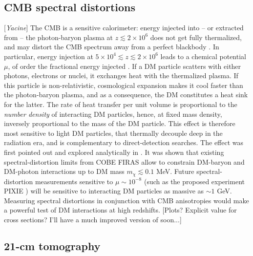 \documentclass[12pt]{article}
\newcommand{\Contributors}[1]{ {\footnotesize [\textit{#1}]}}
\begin{document}
\subsection{CMB spectral distortions}
\Contributors{Yacine}
The CMB is a sensitive calorimeter: energy injected into -- or extracted from -- the photon-baryon plasma at $z \lesssim 2 \times 10^6$ does not get fully thermalized, and may distort the CMB spectrum away from a perfect blackbody \cite{Hu_96}. In particular, energy injection at $5 \times 10^4 \lesssim z \lesssim 2 \times 10^6$ leads to a chemical potential $\mu$, of order the fractional energy injected \cite{Chluba_13}. If a DM particle scatters with either photons, electrons or nuclei, it exchanges heat with the thermalized plasma. If this particle is non-relativistic, cosmological expansion makes it cool faster than the photon-baryon plasma, and as a consequence, the DM constitutes a heat sink for the latter. The rate of heat transfer per unit volume is proportional to the \emph{number density} of interacting DM particles, hence, at fixed mass density, inversely proportional to the mass of the DM particle. This effect is therefore most sensitive to light DM particles, that thermally decouple deep in the radiation era, and is complementary to direct-detection searches. The effect was first pointed out and explored analytically in \cite{AliHaimoud_15}. It was shown that existing spectral-distortion limits from COBE FIRAS \cite{Fixsen_96} allow to constrain DM-baryon and DM-photon interactions up to DM mass $m_\chi \lesssim 0.1$ MeV. Future spectral-distortion measurements sensitive to $\mu \sim 10^{-8}$ (such as the proposed experiment PIXIE \cite{Kogut_11}) will be sensitive to interacting DM particles as massive as $\sim 1$ GeV. Measuring spectral distortions in conjunction with CMB anisotropies would make a powerful test of DM interactions at high redshifts. [Plots? Explicit value for cross sections? I'll have a much improved version of \cite{AliHaimoud_15} soon...]

\subsection{21-cm tomography}
\end{document}

